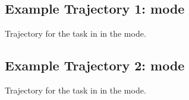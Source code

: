 \subsection{Example Trajectory 1: \basemode mode}
\label{app:telecom-example-trajectory-base}
Trajectory for the task in  in the \basemode mode.


\subsection{Example Trajectory 2: \solomode mode}
\label{app:telecom-example-trajectory-solo}
Trajectory for the task in  in the \solomode mode.




